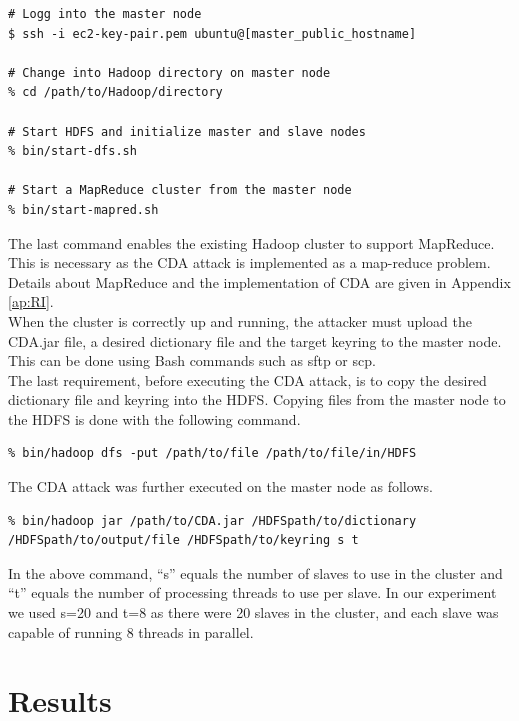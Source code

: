 \documentclass[pdftex,english,10pt,b5paper,twoside]{book}
\begin{document}
\lstset{language=bash, label=lst:hadoop, caption=Starting Hadoop cluster with HDFS}
\begin{lstlisting}
# Logg into the master node
$ ssh -i ec2-key-pair.pem ubuntu@[master_public_hostname]

# Change into Hadoop directory on master node
% cd /path/to/Hadoop/directory

# Start HDFS and initialize master and slave nodes
% bin/start-dfs.sh

# Start a MapReduce cluster from the master node
% bin/start-mapred.sh
\end{lstlisting}
The last command enables the existing
Hadoop cluster to support MapReduce. This is necessary as the CDA
attack is implemented as a map-reduce problem. Details about MapReduce and the
implementation of CDA are given in Appendix \ref{ap:RI}.\\

\noindent When the cluster is correctly up and running, the attacker must
upload the CDA.jar file, a desired dictionary file and the target keyring to the
master node. This can be done using Bash commands such as sftp or scp.\\

\noindent The last requirement, before executing the CDA attack, is to copy the
desired dictionary file and keyring into the HDFS. Copying files from the master
node to the HDFS is done with the following command.

\lstset{language=bash, label=lst:cpHDFS, caption=Copying files into HDFS}
\begin{lstlisting}
% bin/hadoop dfs -put /path/to/file /path/to/file/in/HDFS
\end{lstlisting}

\noindent The CDA attack was further executed on the master node as follows.

\lstset{language=bash, label=lst:CDA, caption=Executing the CDA attack}
\begin{lstlisting}
% bin/hadoop jar /path/to/CDA.jar /HDFSpath/to/dictionary /HDFSpath/to/output/file /HDFSpath/to/keyring s t
\end{lstlisting}
In the above command, ``s'' equals the number of slaves to use in the cluster
and ``t'' equals the number of processing threads to use per slave. In our
experiment we used s=20 and t=8 as there were 20 slaves in the cluster, and each
slave was capable of running 8 threads in parallel.
\chapter{Results}
\end{document}
